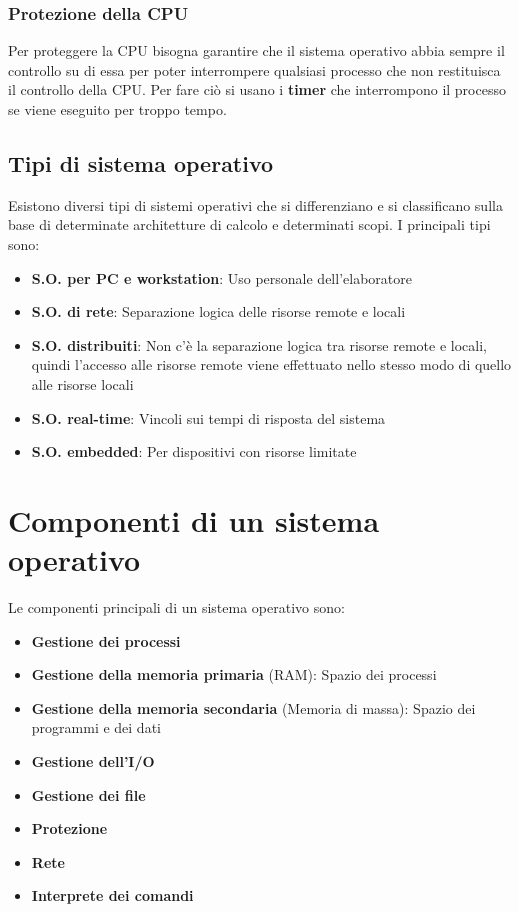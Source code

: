 \documentclass[a4paper]{article}
\begin{document}
\subsubsection{Protezione della CPU}
Per proteggere la CPU bisogna garantire che il sistema operativo abbia sempre il controllo
su di essa per poter interrompere qualsiasi processo che non restituisca il controllo
della CPU. Per fare ciò si usano i \textbf{timer} che interrompono il processo se
viene eseguito per troppo tempo.

\subsection{Tipi di sistema operativo}
Esistono diversi tipi di sistemi operativi che si differenziano e si classificano sulla
base di determinate architetture di calcolo e determinati scopi. I principali tipi sono:
\begin{itemize}
  \item \textbf{S.O. per PC e workstation}: Uso personale dell'elaboratore
  \item \textbf{S.O. di rete}: Separazione logica delle risorse remote e locali
  \item \textbf{S.O. distribuiti}: Non c'è la separazione logica tra risorse remote e
    locali, quindi l'accesso alle risorse remote viene effettuato nello stesso modo
    di quello alle risorse locali
  \item \textbf{S.O. real-time}: Vincoli sui tempi di risposta del sistema
  \item \textbf{S.O. embedded}: Per dispositivi con risorse limitate
\end{itemize}

\section{Componenti di un sistema operativo}
Le componenti principali di un sistema operativo sono:
\begin{itemize}
  \item \textbf{Gestione dei processi}
  \item \textbf{Gestione della memoria primaria} (RAM): Spazio dei processi
  \item \textbf{Gestione della memoria secondaria} (Memoria di massa): Spazio dei
    programmi e dei dati
  \item \textbf{Gestione dell'I/O}
  \item \textbf{Gestione dei file}
  \item \textbf{Protezione}
  \item \textbf{Rete}
  \item \textbf{Interprete dei comandi}
\end{itemize}
\end{document}
